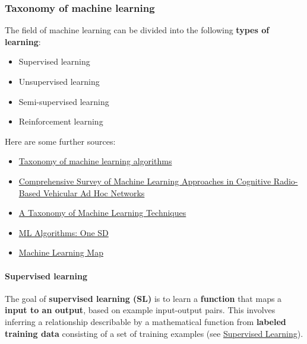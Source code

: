 \documentclass [oneside,10pt,a4paper,ngerman,BCOR10mm,headsepline,parindent,final]{scrartcl}
\providecommand{\tightlist}{%
      \setlength{\itemsep}{0pt}\setlength{\parskip}{0pt}}
\begin{document}
    \hypertarget{taxonomy-of-machine-learning}{%
\subsubsection{Taxonomy of machine
learning}\label{taxonomy-of-machine-learning}}

The field of machine learning can be divided into the following
\textbf{types of learning}:

\begin{itemize}
\tightlist
\item
  Supervised learning
\item
  Unsupervised learning
\item
  Semi-supervised learning
\item
  Reinforcement learning
\end{itemize}

Here are some further sources:

\begin{itemize}
\tightlist
\item
  \href{https://subscription.packtpub.com/book/big-data-/9781783558742/1/ch01lvl1sec12/taxonomy-of-machine-learning-algorithms}{Taxonomy
  of machine learning algorithms}
\item
  \href{https://www.researchgate.net/publication/340878018_Comprehensive_Survey_of_Machine_Learning_Approaches_in_Cognitive_Radio-Based_Vehicular_Ad_Hoc_Networks}{Comprehensive
  Survey of Machine Learning Approaches in Cognitive Radio-Based
  Vehicular Ad Hoc Networks}
\item
  \href{https://www.researchgate.net/publication/358089496_A_Taxonomy_of_Machine_Learning_Techniques}{A
  Taxonomy of Machine Learning Techniques}
\item
  \href{https://medium.com/@Shaier/ml-algorithms-one-sd-\%CF\%83-74bcb28fafb6}{ML
  Algorithms: One SD}
\item
  \href{https://github.com/trekhleb/homemade-machine-learning\#machine-learning-map}{Machine
  Learning Map}
\end{itemize}

    \hypertarget{supervised-learning}{%
\paragraph{Supervised learning}\label{supervised-learning}}

The goal of \textbf{supervised learning (SL)} is to learn a
\textbf{function} that maps a \textbf{input to an output}, based on
example input-output pairs. This involves inferring a relationship
describable by a mathematical function from \textbf{labeled training
data} consisting of a set of training examples (see
\href{https://en.wikipedia.org/wiki/Supervised_learning}{Supervised
Learning}).
\end{document}
